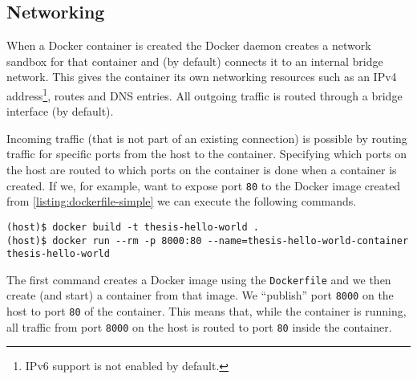 \subsection{Networking}
When a Docker container is created the Docker daemon creates a network sandbox for that container and (by default) connects it to an internal bridge network. This gives the container its own networking resources such as an IPv4 address\footnote{IPv6 support is not enabled by default.}, routes and DNS entries. All outgoing traffic is routed through a bridge interface (by default).

\medskip

Incoming traffic (that is not part of an existing connection) is possible by routing traffic for specific ports from the host to the container.
Specifying which ports on the host are routed to which ports on the container is done when a container is created. If we, for example, want to expose port \lstinline{80} to the Docker image created from \autoref{listing:dockerfile-simple} we can execute the following commands.

\begin{lstlisting}[caption={Creating a Docker container with exposed port.},label={listing:docker-port},captionpos=b]
(host)$ docker build -t thesis-hello-world .
(host)$ docker run --rm -p 8000:80 --name=thesis-hello-world-container thesis-hello-world
\end{lstlisting}

The first command creates a Docker image using the \lstinline{Dockerfile} and we then create (and start) a container from that image. We ``publish'' port \lstinline{8000} on the host to port \lstinline{80} of the container. This means that, while the container is running, all traffic from port \lstinline{8000} on the host is routed to port \lstinline{80} inside the container.
